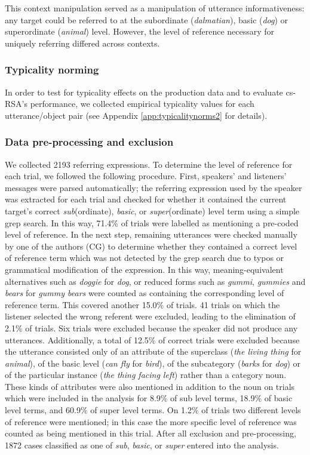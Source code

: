 \documentclass[11pt]{article}
\newcommand{\appref}[1]{Appendix \ref{#1}}
\begin{document}
This context manipulation served as a manipulation of utterance informativeness: any target could be referred to at the subordinate (\emph{dalmatian}), basic (\emph{dog}) or superordinate (\emph{animal}) level. However, the level of reference necessary for uniquely referring differed across contexts.


\subsubsection{Typicality norming}
\label{sec:typicalitynormingnominal}

In order to test for typicality effects on the production data and to evaluate cs-RSA's performance, we collected empirical typicality values for each utterance/object pair (see \appref{app:typicalitynorms2} for details).

\subsubsection{Data pre-processing and exclusion}

We collected 2193 referring expressions. To determine the level of reference for each trial, we followed the following procedure. First, speakers' and listeners' messages were parsed automatically; the referring expression used by the speaker was extracted for each trial and checked for whether it contained the current target's correct \emph{sub}(ordinate), \emph{basic}, or \emph{super}(ordinate) level term using a simple grep search. In this way, 71.4\% of trials were labelled as mentioning a pre-coded level of reference. In the next step, remaining utterances were checked manually by one of the authors (CG) to determine whether they contained a correct level of reference term which was not detected by the grep search due to typos or grammatical modification of the expression. In this way, meaning-equivalent alternatives such as \emph{doggie} for \emph{dog}, or reduced forms such as \emph{gummi}, \emph{gummies} and \emph{bears} for \emph{gummy bears} were counted as containing the corresponding level of reference term. This covered another 15.0\% of trials. 41 trials on which the listener selected the wrong referent were excluded, leading to the elimination of 2.1\% of trials. Six trials were excluded because the speaker did not produce any utterances. Additionally, a total of 12.5\% of correct trials were excluded because the utterance consisted only of an attribute of the superclass (\emph{the living thing} for \emph{animal}), of the basic level (\emph{can fly} for \emph{bird}), of the subcategory (\emph{barks} for \emph{dog}) or of the particular instance (\emph{the thing facing left}) rather than a category noun. These kinds of attributes were also mentioned in addition to the noun on trials which were included in the analysis for 8.9\% of sub level terms, 18.9\% of basic level terms, and 60.9\% of super level terms. On 1.2\% of trials two different levels of reference were mentioned; in this case the more specific level of reference was counted as being mentioned in this trial. After all exclusion and pre-processing, 1872 cases classified as one of \emph{sub}, \emph{basic}, or \emph{super} entered into the analysis.
\end{document}
